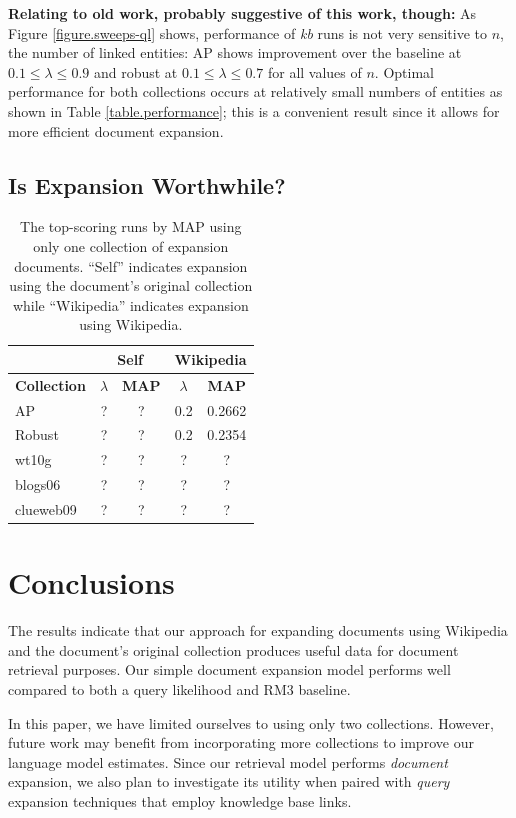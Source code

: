 \documentclass{report}
\begin{document}
\textbf{Relating to old work, probably suggestive of this work, though:} As Figure \ref{figure.sweeps-ql} shows, performance of \textit{kb} runs is not very sensitive to $n$, the number of linked entities: AP shows improvement over the baseline at $0.1 \leq \lambda \leq 0.9$ and robust at $0.1 \leq \lambda \leq 0.7$ for all values of $n$. Optimal performance for both collections occurs at relatively small numbers of entities as shown in Table \ref{table.performance}; this is a convenient result since it allows for more efficient document expansion.

\subsection{Is Expansion Worthwhile?}\label{section.results.expansion}

\begin{table}[htbp]
\centering
\begin{tabular}{|l|c|c|c|c|} \hline
& \multicolumn{2}{c}{Self} & \multicolumn{2}{|c|}{Wikipedia} \\ \hline
{\bf Collection} & {\bf $\lambda$} & {\bf MAP} & {\bf $\lambda$} & {\bf MAP} \\ \hline
AP & ? & ? & 0.2 & 0.2662 \\ \hline
Robust & ? & ? & 0.2 & 0.2354 \\ \hline
wt10g & ? & ? & ? & ? \\ \hline
blogs06 & ? & ? & ? & ? \\ \hline
clueweb09 & ? & ? & ? & ? \\ \hline
\end{tabular}
\caption{The top-scoring runs by MAP using only one collection of expansion documents. ``Self'' indicates expansion using the document's original collection while ``Wikipedia'' indicates expansion using Wikipedia.}
\label{table.performance.single}
\end{table}

\section{Conclusions}\label{section.conclusions}

The results indicate that our approach for expanding documents using Wikipedia and the document's original collection produces useful data for document retrieval purposes. Our simple document expansion model performs well compared to both a query likelihood and RM3 baseline.

In this paper, we have limited ourselves to using only two collections. However, future work may benefit from incorporating more collections to improve our language model estimates. Since our retrieval model performs \textit{document} expansion, we also plan to investigate its utility when paired with \textit{query} expansion techniques that employ knowledge base links.
\end{document}
